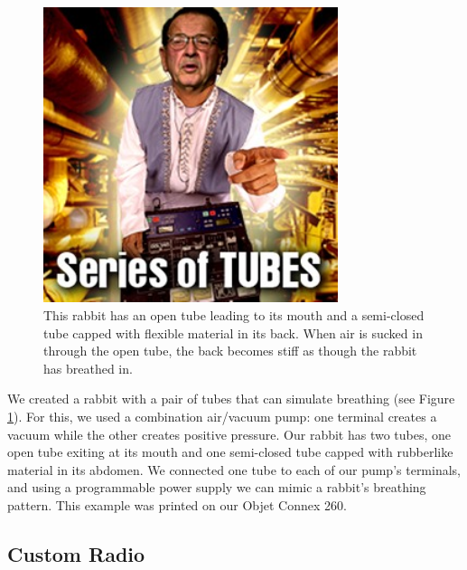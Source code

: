 \begin{figure}[h]
\centering
    \includegraphics[width=3.4in]{figures/series-of-tubes.jpg}
\caption{This rabbit has an open tube leading to its mouth and a semi-closed tube capped with flexible material in its back.  When air is sucked in through the open tube, the back becomes stiff as though the rabbit has breathed in.}
\label{fig:breathe}
\end{figure}

We created a rabbit with a pair of tubes that can simulate breathing (see Figure \ref{fig:breathe}).  For this, we used a combination air/vacuum pump: one terminal creates a vacuum while the other creates positive pressure.  Our rabbit has two tubes, one open tube exiting at its mouth and one semi-closed tube capped with rubberlike material in its abdomen.  We connected one tube to each of our pump's terminals, and using a programmable power supply we can mimic a rabbit's breathing pattern.  This example was printed on our Objet Connex 260. 

\subsection{Custom Radio}

